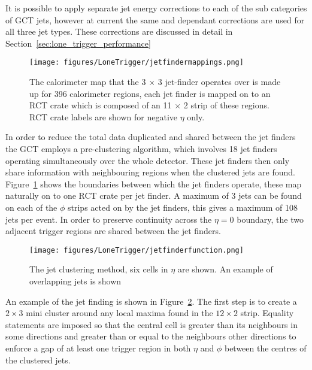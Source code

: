 It is possible to apply separate jet energy corrections to each of the sub 
categories of GCT jets, however at current the same \ET and \ETA dependant corrections are used for all three jet types.  These corrections are discussed in detail in 
Section~\ref{sec:lone_trigger_performance}

\begin{figure}[ht]
  \centering    
  \texttt{[image: figures/LoneTrigger/jetfindermappings.png]}
  \caption{The calorimeter map that the 3 $\times$ 3 jet-finder operates over
   is made up for 396 calorimeter regions, each jet finder is mapped on to an 
   RCT crate which is composed of an 11 $\times$ 2 strip of these regions. RCT
   crate labels are shown for negative $\eta$ only. }
  \label{fig:figures_LoneTrigger_jetfindermappings}
\end{figure}

In order to reduce the total data duplicated and shared between the jet finders
the GCT employs a pre-clustering algorithm, which involves 18 jet finders 
operating simultaneously over the whole detector. These jet finders then only
share information with neighbouring regions when the clustered jets are found.
Figure~\ref{fig:figures_LoneTrigger_jetfindermappings} shows the boundaries 
between which the jet finders operate, these map naturally on to one RCT crate 
per jet finder. A maximum of 3 jets can be found on each of the $\phi$ strips
acted on by the jet finders, this gives a maximum of 108 jets per event. In
order to preserve continuity across the $\eta = 0$ boundary, the two adjacent
trigger regions are shared between the jet finders.


\begin{figure}[ht]
  \centering
 \texttt{[image: figures/LoneTrigger/jetfinderfunction.png]}
  \caption{The \Lone jet clustering method, six cells in $\eta$ are shown. An
  example of overlapping jets is shown}
  \label{fig:figures_LoneTrigger_jetfinderfunction}
\end{figure}


An example of the jet finding is shown in
Figure~\ref{fig:figures_LoneTrigger_jetfinderfunction}. The first step is to 
create a $2 \times 3$ mini cluster around any local maxima found in the $12 
\times 2$ strip. Equality statements are imposed so that the central cell is 
greater than its neighbours in some directions and greater than or equal to the 
neighbours other directions to enforce a gap of at least one trigger region in 
both $\eta$ and $\phi$ between the centres of the clustered jets.

